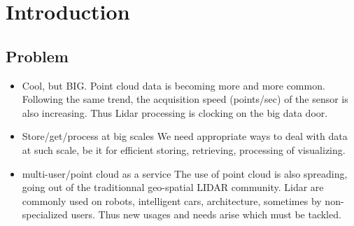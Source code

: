 

\section{Introduction}
	\subsection{Problem} 
		
		
		\begin{itemize}
			\item Cool, but BIG.
				Point cloud data is becoming more and more common. Following the same trend, the acquisition speed (points/sec) of the sensor is also increasing.
				Thus Lidar processing is clocking on the big data door.
			\item Store/get/process at big scales
				We need appropriate ways to deal with data at such scale,
				be it for efficient storing, retrieving, processing of visualizing.
			\item multi-user/point cloud as a service
				The use of point cloud is also spreading, going out of the traditionnal geo-spatial LIDAR community. Lidar are commonly used on robots, intelligent cars, architecture, sometimes by non-specialized users.
				Thus new usages and needs arise which must be tackled.
		\end{itemize}  
